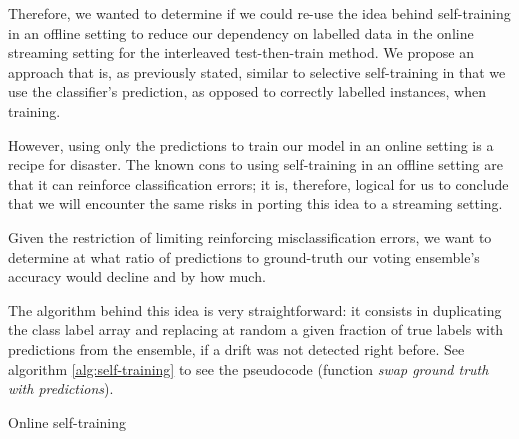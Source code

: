 Therefore, we wanted to determine if we could re-use the idea behind self-training in an offline setting to reduce our dependency on labelled data in the online streaming setting for the interleaved test-then-train method. We propose an approach that is, as previously stated, similar to selective self-training in that we use the classifier's prediction, as opposed to correctly labelled instances, when training.

However, using only the predictions to train our model in an online setting is a recipe for disaster. The known cons to using self-training in an offline setting are that it can reinforce classification errors; it is, therefore, logical for us to conclude that we will encounter the same risks in porting this idea to a streaming setting.

Given the restriction of limiting reinforcing misclassification errors, we want to determine at what ratio of predictions to ground-truth our voting ensemble's accuracy would decline and by how much.

The algorithm behind this idea is very straightforward: it consists in duplicating the class label array and replacing at random a given fraction of true labels with predictions from the ensemble, if a drift was not detected right before. See algorithm \ref{alg:self-training} to see the pseudocode (function \textit{swap ground truth with predictions}).

\begin{algorithm}

\caption{\label{alg:self-training}Online self-training}
\end{algorithm}


